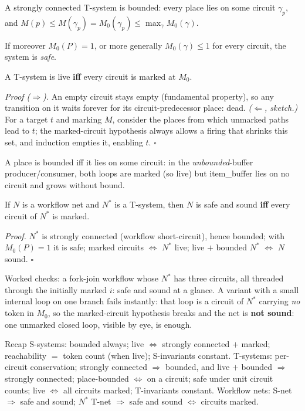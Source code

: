 \begin{lemma}
A strongly connected T-system is bounded: every place lies on some circuit $\gamma_p$, and $M(p) \leq M(\gamma_p) = M_0(\gamma_p) \leq \max_\gamma M_0(\gamma)$.
\end{lemma}

\begin{corollary}
If moreover $M_0(P) = 1$, or more generally $M_0(\gamma) \leq 1$ for every circuit, the system is \emph{safe}.
\end{corollary}

\begin{theorem}
A T-system is live \textbf{iff} every circuit is marked at $M_0$.
\end{theorem}
\textit{Proof ($\Rightarrow$).} An empty circuit stays empty (fundamental property), so any transition on it waits forever for its circuit-predecessor place: dead. \textit{($\Leftarrow$, sketch.)} For a target $t$ and marking $M$, consider the places from which unmarked paths lead to $t$; the marked-circuit hypothesis always allows a firing that shrinks this set, and induction empties it, enabling $t$. \hfill$\square$

A place is bounded iff it lies on some circuit: in the \emph{unbounded}-buffer producer/consumer, both loops are marked (so live) but \textsf{item\_buffer} lies on no circuit and grows without bound.

\begin{theorem}
If $N$ is a workflow net and $N^*$ is a T-system, then $N$ is safe and sound \textbf{iff} every circuit of $N^*$ is marked.
\end{theorem}
\textit{Proof.} $N^*$ is strongly connected (workflow short-circuit), hence bounded; with $M_0(P) = 1$ it is safe; marked circuits $\iff$ $N^*$ live; live $+$ bounded $N^*$ $\iff$ $N$ sound. \hfill$\square$

Worked checks: a fork-join workflow whose $N^*$ has three circuits, all threaded through the initially marked $i$: safe and sound at a glance. A variant with a small internal loop on one branch fails instantly: that loop is a circuit of $N^*$ carrying \emph{no} token in $M_0$, so the marked-circuit hypothesis breaks and the net is \textbf{not sound}: one unmarked closed loop, visible by eye, is enough.

\begin{notebox}{Recap}
S-systems: bounded always; live $\iff$ strongly connected $+$ marked; reachability $=$ token count (when live); S-invariants constant. T-systems: per-circuit conservation; strongly connected $\Rightarrow$ bounded, and live $+$ bounded $\Rightarrow$ strongly connected; place-bounded $\iff$ on a circuit; safe under unit circuit counts; live $\iff$ all circuits marked; T-invariants constant. Workflow nets: S-net $\Rightarrow$ safe and sound; $N^*$ T-net $\Rightarrow$ safe and sound $\iff$ circuits marked.
\end{notebox}
